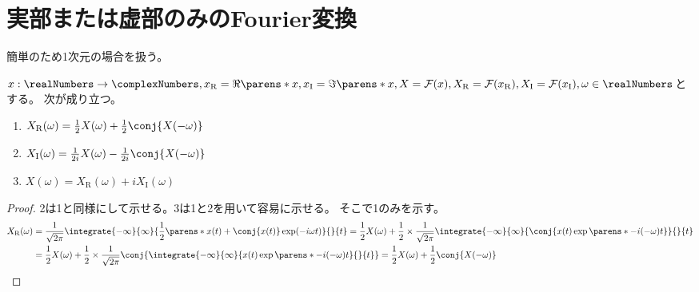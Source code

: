     \section{実部または虚部のみのFourier変換}
        簡単のため1次元の場合を扱う。
        \begin{shadebox}
            $x:\realNumbers\to\complexNumbers,x_\mathrm{R} = \Re\parens*{x},x_\mathrm{I} = \Im\parens*{x},X = \mathcal{F}(x),X_\mathrm{R} = \mathcal{F}(x_\mathrm{R}),X_\mathrm{I} = \mathcal{F}(x_\mathrm{I}),\omega\in\realNumbers$とする。
            次が成り立つ。
            \begin{enumerate}
                \item $X_\mathrm{R}(\omega) = \frac{1}{2}X(\omega) + \frac{1}{2}\conj{X(-\omega)}$
                \item $X_\mathrm{I}(\omega) = \frac{1}{2i}X(\omega) - \frac{1}{2i}\conj{X(-\omega)}$
                \item $X(\omega) = X_\mathrm{R}(\omega) + i X_\mathrm{I}(\omega)$
            \end{enumerate}
        \end{shadebox}
        \begin{proof}
            2は1と同様にして示せる。3は1と2を用いて容易に示せる。
            そこで1のみを示す。
            \begin{align*}
                X_\mathrm{R}(\omega) &= \frac{1}{\sqrt{2\pi}}\integrate{-\infty}{\infty}{\frac{1}{2}\parens*{x(t)+\conj{x(t)}}\exp(-i\omega t)}{}{t} = \frac{1}{2}X(\omega) + \frac{1}{2}\times\frac{1}{\sqrt{2\pi}}\integrate{-\infty}{\infty}{\conj{x(t)\exp\parens*{-i(-\omega) t}}}{}{t} \\
                &= \frac{1}{2}X(\omega) + \frac{1}{2}\times\frac{1}{\sqrt{2\pi}}\conj{\integrate{-\infty}{\infty}{x(t)\exp\parens*{-i(-\omega) t}}{}{t}} = \frac{1}{2}X(\omega) + \frac{1}{2}\conj{X(-\omega)}
            \end{align*}
        \end{proof}
